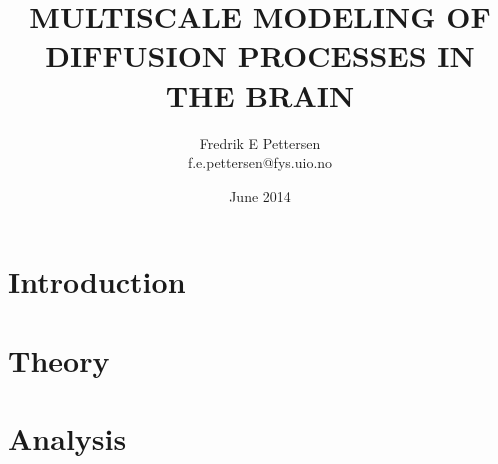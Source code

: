 \documentclass[twoside,english]{uiofysmaster}
\author{Fredrik E Pettersen\\ f.e.pettersen@fys.uio.no}
\title{\uppercase{Multiscale modeling of diffusion processes in the brain}}
\date{June 2014}
\begin{document}

\cleardoublepage





\tableofcontents
\clearpage
\listoffigures

\clearpage
\printnomenclature


\chapter{Introduction}
\clearpage


\chapter{Theory}
\clearpage


\chapter{Analysis}
\clearpage


\printbibliography
\end{document}
